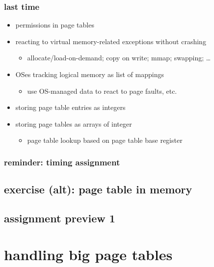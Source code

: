\date{}
\title{}
\date{}

\begin{frame}
    \titlepage
\end{frame}



\begin{frame}
\frametitle{last time}
\begin{itemize}
\item permissions in page tables
\item reacting to virtual memory-related exceptions without crashing
    \begin{itemize}
    \item allocate/load-on-demand; copy on write; mmap; swapping; \ldots
    \end{itemize}
\item OSes tracking logical memory as list of mappings
    \begin{itemize}
    \item use OS-managed data to react to page faults, etc.
    \end{itemize}
\item storing page table entries as integers
\item storing page tables as arrays of integer
    \begin{itemize}
    \item page table lookup based on page table base register
    \end{itemize}
\end{itemize}
\end{frame}

\begin{frame}
\frametitle{reminder: timing assignment}
\end{frame}

\subsection{exercise (alt): page table in memory}


\subsection{assignment preview 1}





\section{handling big page tables}
